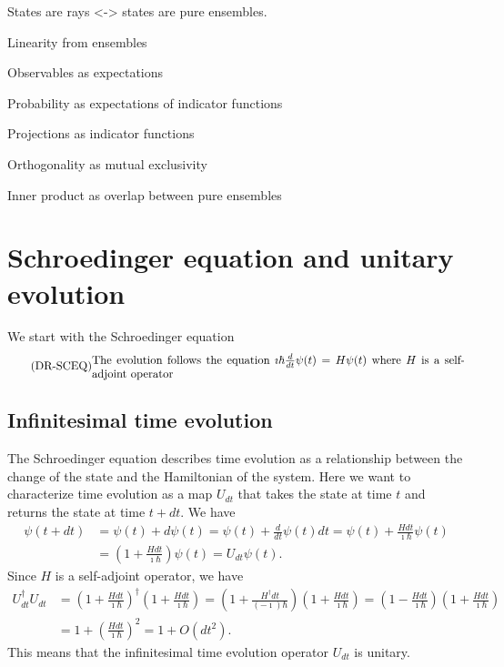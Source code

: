 States are rays <-> states are pure ensembles.

Linearity from ensembles

Observables as expectations

Probability as expectations of indicator functions

Projections as indicator functions

Orthogonality as mutual exclusivity

Inner product as overlap between pure ensembles

\section{Schroedinger equation and unitary evolution}

We start with the Schroedinger equation
\begin{equation}\label{rp-qm-uev-condSchroedingerEq}
	\tag{DR-SCEQ}
	\eqtext{The evolution follows the equation $\imath \hbar \frac{d}{dt} \psi(t) = H \psi(t)$ where $H$ is a self-adjoint operator}
\end{equation}

\subsection{Infinitesimal time evolution}

The Schroedinger equation describes time evolution as a relationship between the change of the state and the Hamiltonian of the system. Here we want to characterize time evolution as a map $U_{dt}$ that takes the state at time $t$ and returns the state at time $t + dt$. We have
\begin{equation}
	\begin{aligned}
		\psi(t+dt) &= \psi(t) + d\psi(t) = \psi(t) + \frac{d}{dt} \psi(t) dt = \psi(t)+ \frac{H dt}{\imath \hbar} \psi(t)\\
		&= \left(1 + \frac{H dt}{\imath \hbar}\right)\psi(t) = U_{dt}\psi(t).
	\end{aligned}
\end{equation}
Since $H$ is a self-adjoint operator, we have
\begin{equation}
	\begin{aligned}
		U_{dt}^\dagger U_{dt} &= \left(1 + \frac{H dt}{\imath \hbar}\right)^\dagger \left(1 + \frac{H dt}{\imath \hbar}\right) = \left(1 + \frac{H^\dagger dt}{(- \imath) \hbar}\right) \left(1 + \frac{H dt}{\imath \hbar}\right) = \left(1 - \frac{H dt}{\imath \hbar}\right) \left(1 + \frac{H dt}{\imath \hbar}\right) \\
		&= 1 + \left(\frac{H dt}{\imath \hbar}\right)^2 = 1 + O(dt^2).
	\end{aligned}
\end{equation}
This means that the infinitesimal time evolution operator $U_{dt}$ is unitary.

